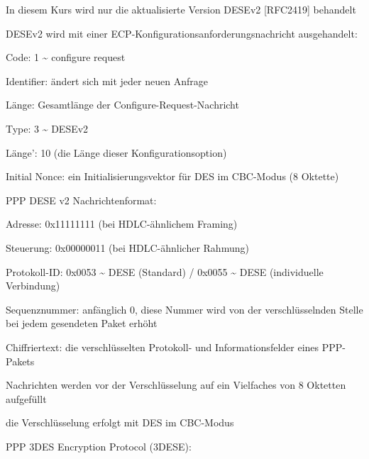 \documentclass[a4paper]{article}
\begin{document}
\begin{multicols}{3}
\begin{itemize*}
            \begin{itemize*}
                  \item In diesem Kurs wird nur die aktualisierte Version DESEv2 {[}RFC2419{]} behandelt
                  \item DESEv2 wird mit einer ECP-Konfigurationsanforderungsnachricht ausgehandelt:
                  \begin{itemize*} \item Code: 1 \textasciitilde{} configure request \item Identifier: ändert sich mit jeder neuen Anfrage \item Länge: Gesamtlänge der Configure-Request-Nachricht \item Type: 3 \textasciitilde{} DESEv2 \item Länge': 10 (die Länge dieser Konfigurationsoption) \item Initial Nonce: ein Initialisierungsvektor für DES im CBC-Modus (8 Oktette) \end{itemize*}
            \end{itemize*}
            \item
            PPP DESE v2 Nachrichtenformat:

            \begin{itemize*}
                  \item Adresse: 0x11111111 (bei HDLC-ähnlichem Framing)
                  \item Steuerung: 0x00000011 (bei HDLC-ähnlicher Rahmung)
                  \item Protokoll-ID: 0x0053 \textasciitilde{} DESE (Standard) / 0x0055 \textasciitilde{} DESE (individuelle Verbindung)
                  \item Sequenznummer: anfänglich 0, diese Nummer wird von der verschlüsselnden Stelle bei jedem gesendeten Paket erhöht
                  \item Chiffriertext: die verschlüsselten Protokoll- und Informationsfelder eines PPP-Pakets
                  \begin{itemize*} \item Nachrichten werden vor der Verschlüsselung auf ein Vielfaches von 8 Oktetten aufgefüllt \item die Verschlüsselung erfolgt mit DES im CBC-Modus \end{itemize*}
            \end{itemize*}
            \item
            PPP 3DES Encryption Protocol (3DESE):


\end{itemize*}
\end{multicols}
\end{document}
